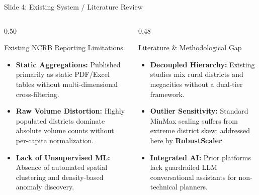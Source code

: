 \documentclass[aspectratio=169,10pt]{beamer}
\begin{document}
\begin{frame}{Slide 4: Existing System / Literature Review}
    \begin{columns}[T]
        \begin{column}{0.50\textwidth}
            \begin{block}{Existing NCRB Reporting Limitations}
                \begin{itemize}
                    \item \textbf{Static Aggregations:} Published primarily as static PDF/Excel tables without multi-dimensional cross-filtering.
                    \item \textbf{Raw Volume Distortion:} Highly populated districts dominate absolute volume counts without per-capita normalization.
                    \item \textbf{Lack of Unsupervised ML:} Absence of automated spatial clustering and density-based anomaly discovery.
                \end{itemize}
            \end{block}
        \end{column}
        \begin{column}{0.48\textwidth}
            \begin{block}{Literature \& Methodological Gap}
                \begin{itemize}
                    \item \textbf{Decoupled Hierarchy:} Existing studies mix rural districts and megacities without a dual-tier framework.
                    \item \textbf{Outlier Sensitivity:} Standard MinMax scaling suffers from extreme district skew; addressed here by \textbf{RobustScaler}.
                    \item \textbf{Integrated AI:} Prior platforms lack guardrailed LLM conversational assistants for non-technical planners.
                \end{itemize}
            \end{block}
        \end{column}
    \end{columns}
\end{frame}
\end{document}
